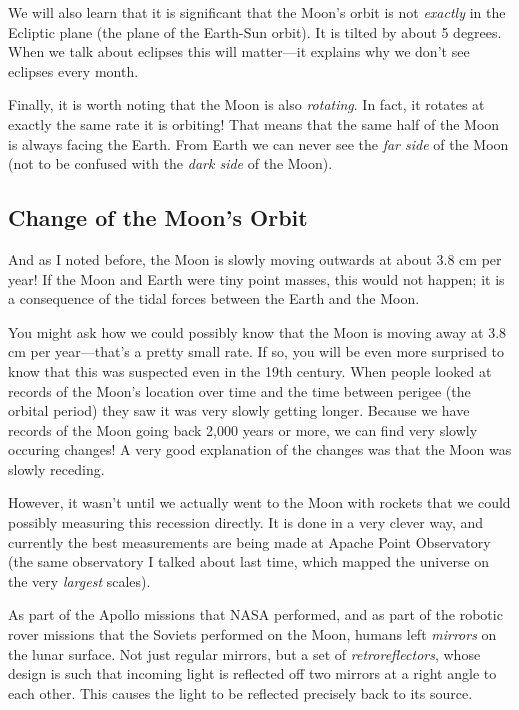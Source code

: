 \documentclass[12pt, preprint]{aastex}
\begin{document}
We will also learn that it is significant that the Moon's orbit is not
{\it exactly} in the Ecliptic plane (the plane of the Earth-Sun
orbit). It is tilted by about 5 degrees. When we talk about eclipses
this will matter---it explains why we don't see eclipses every month.

Finally, it is worth noting that the Moon is also {\it rotating}. In
fact, it rotates at exactly the same rate it is orbiting! That means
that the same half of the Moon is always facing the Earth. From Earth
we can never see the {\it far side} of the Moon (not to be confused
with the {\it dark side} of the Moon).

\subsection{Change of the Moon's Orbit}

And as I noted before, the Moon is slowly moving outwards at about 3.8
cm per year! If the Moon and Earth were tiny point masses, this would
not happen; it is a consequence of the tidal forces between the Earth
and the Moon.

You might ask how we could possibly know that the Moon is moving away
at 3.8 cm per year---that's a pretty small rate. If so, you will be
even more surprised to know that this was suspected even in the 19th
century. When people looked at records of the Moon's location over
time and the time between perigee (the orbital period) they saw it was
very slowly getting longer. Because we have records of the Moon going
back 2,000 years or more, we can find very slowly occuring changes! A
very good explanation of the changes was that the Moon was slowly
receding.

However, it wasn't until we actually went to the Moon with rockets
that we could possibly measuring this recession directly. It is done
in a very clever way, and currently the best measurements are being
made at Apache Point Observatory (the same observatory I talked about
last time, which mapped the universe on the very {\it largest}
scales).

As part of the Apollo missions that NASA performed, and as part of the
robotic rover missions that the Soviets performed on the Moon, humans
left {\it mirrors} on the lunar surface. Not just regular mirrors, but
a set of {\it retroreflectors}, whose design is such that incoming
light is reflected off two mirrors at a right angle to each
other. This causes the light to be reflected precisely back to its
source. 
\end{document}
